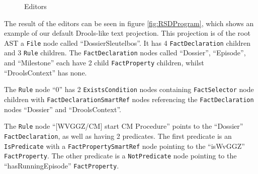 \begin{figure}
    \centering
    \caption{Editors}
    \label{fig:RSDEditors}
\end{figure}

\newpage

The result of the editors can be seen in figure \ref{fig:RSDProgram}, which shows an example of our default Drools-like text projection. 
This projection is of the root AST a \texttt{File} node called ``DossierSleutelbos''.
It has 4 \texttt{FactDeclaration} children and 3 \texttt{Rule} children.
The \texttt{FactDeclaration} nodes called ``Dossier'', ``Episode'', and ``Milestone'' each have 2 child \texttt{FactProperty} children, whilst ``DroolsContext'' has none.

The \texttt{Rule} node ``0'' has 2 \texttt{ExistsCondition} nodes containing \texttt{FactSelector} node children with \texttt{FactDeclarationSmartRef} nodes referencing the \texttt{FactDeclaration} nodes ``Dossier'' and ``DroolsContext''.

The \texttt{Rule} node ``[WVGGZ/CM] start CM Procedure'' points to the ``Dossier'' \texttt{FactDeclaration}, as well as having 2 predicates.
The first predicate is an \texttt{IsPredicate} with a \texttt{FactPropertySmartRef} node pointing to the ``isWvGGZ'' \texttt{FactProperty}.
The other predicate is a \texttt{NotPredicate} node pointing to the ``hasRunningEpisode'' \texttt{FactProperty}.


